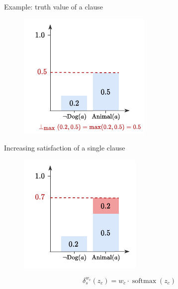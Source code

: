 \documentclass{beamer}
\newcommand{\backupend}{
	\addtocounter{framenumberappendix}{-\value{framenumber}}
	\addtocounter{framenumber}{\value{framenumberappendix}} 
}
\begin{document}
\begin{frame}{Example: truth value of a clause}
	\begin{figure}
		\includegraphics[width=0.6\linewidth]{images/tvalues_literals.pdf}
	\end{figure}
\end{frame}
\begin{frame}{Increasing satisfaction of a single clause}
	\begin{figure}
		\includegraphics[width=0.499\linewidth]{images/boost_options2.pdf}
	\end{figure}
\pause
	\begin{equation*}
	\delta_{s}^{w_{c}}\left(z_{c}\right)=w_{c} \cdot \operatorname{softmax}\left(z_{c}\right)
	\end{equation*}
\end{frame}


\backupend
\end{document}
